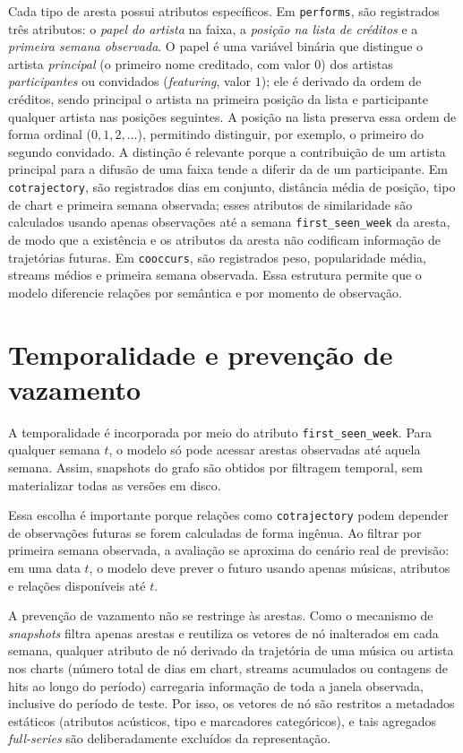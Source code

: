 Cada tipo de aresta possui atributos específicos. Em \texttt{performs}, são registrados três atributos: o \emph{papel do artista} na faixa, a \emph{posição na lista de créditos} e a \emph{primeira semana observada}. O papel é uma variável binária que distingue o artista \emph{principal} (o primeiro nome creditado, com valor $0$) dos artistas \emph{participantes} ou convidados (\emph{featuring}, valor $1$); ele é derivado da ordem de créditos, sendo principal o artista na primeira posição da lista e participante qualquer artista nas posições seguintes. A posição na lista preserva essa ordem de forma ordinal ($0, 1, 2, \dots$), permitindo distinguir, por exemplo, o primeiro do segundo convidado. A distinção é relevante porque a contribuição de um artista principal para a difusão de uma faixa tende a diferir da de um participante. Em \texttt{cotrajectory}, são registrados dias em conjunto, distância média de posição, tipo de chart e primeira semana observada; esses atributos de similaridade são calculados usando apenas observações até a semana \texttt{first\_seen\_week} da aresta, de modo que a existência e os atributos da aresta não codificam informação de trajetórias futuras. Em \texttt{cooccurs}, são registrados peso, popularidade média, streams médios e primeira semana observada. Essa estrutura permite que o modelo diferencie relações por semântica e por momento de observação.


\section{Temporalidade e prevenção de vazamento}
\label{sec:vazamento}

A temporalidade é incorporada por meio do atributo \texttt{first\_seen\_week}. Para qualquer semana $t$, o modelo só pode acessar arestas observadas até aquela semana. Assim, snapshots do grafo são obtidos por filtragem temporal, sem materializar todas as versões em disco.

Essa escolha é importante porque relações como \texttt{cotrajectory} podem depender de observações futuras se forem calculadas de forma ingênua. Ao filtrar por primeira semana observada, a avaliação se aproxima do cenário real de previsão: em uma data $t$, o modelo deve prever o futuro usando apenas músicas, atributos e relações disponíveis até $t$.

A prevenção de vazamento não se restringe às arestas. Como o mecanismo de \emph{snapshots} filtra apenas arestas e reutiliza os vetores de nó inalterados em cada semana, qualquer atributo de nó derivado da trajetória de uma música ou artista nos charts (número total de dias em chart, streams acumulados ou contagens de hits ao longo do período) carregaria informação de toda a janela observada, inclusive do período de teste. Por isso, os vetores de nó são restritos a metadados estáticos (atributos acústicos, tipo e marcadores categóricos), e tais agregados \emph{full-series} são deliberadamente excluídos da representação.

